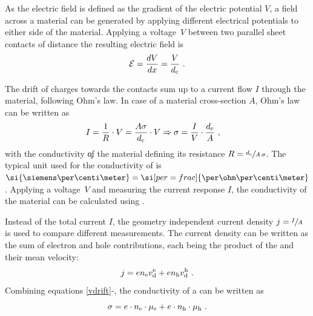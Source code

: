 As the electric field \EField is defined as the gradient of the electric potential $V$, a field across a material can be generated by applying different electrical potentials to either side of the material.
Applying a voltage~$V$ between two parallel sheet contacts of distance \dc the resulting electric field \EField is
\begin{equation}\label{eq:Efield}
\mathcal{E} = \frac{dV}{dx} = \frac{V}{d_\text{c}}
~.
\end{equation}

The drift of charges towards the contacts sum up to a current flow $I$ through the material, following Ohm's%
law. In case of a material cross-section $A$, Ohm's law can be written as
\begin{align}
I&=\frac{1}{R}\cdot V = \frac{A \c}{\dc}\cdot V \Rightarrow \c = \frac{I}{V} \cdot \frac{d_\text{c}}{A}
\label{eq:Cond-I-V-geo}
\KOMMA
\end{align}
with the conductivity \c of the material defining its resistance $R=\sfrac{d_\text{c}}{A \, \c}$. The typical unit used for the conductivity of \SCs is $\si{\siemens\per\centi\meter} = \si[per=frac]{\per\ohm\per\centi\meter}$. Applying a voltage~$V$ and measuring the current response $I$, the conductivity of the material can be calculated using \lasteqn.

Instead of the total current $I$, the geometry independent current density $j=\sfrac{I}{A}$ is used to compare different measurements.
The current density can be written as the sum of electron and hole contributions, each being the product of the \nLong and their mean velocity:
\begin{equation}
 j = e n_\text{e} v_\text{d}^\text{e} + e n_\text{h} v_\text{d}^\text{h}
~.
\end{equation}
Combining equations \eqref{vdrift}-\lasteq, the conductivity of a \SC can be written as
\begin{equation} \label{eq:Cond-CCD-Mob}
 \c = e \cdot \ne \cdot \mobe  + e \cdot \nh \cdot \mobh
\PUNKT
\end{equation}
